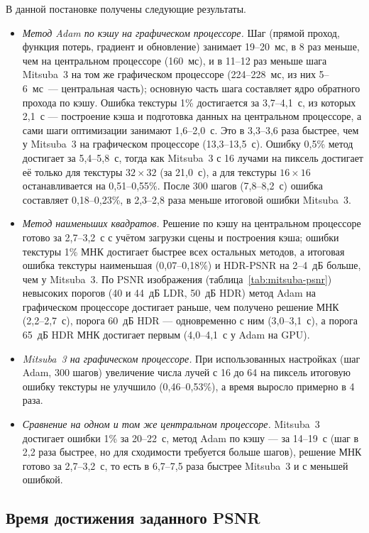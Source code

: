 В данной постановке получены следующие результаты.
\begin{itemize}
    \item \emph{Метод Adam по кэшу на графическом процессоре.} Шаг (прямой проход, функция потерь, градиент и обновление) занимает 19--20~мс, в 8 раз меньше, чем на центральном процессоре (160~мс), и в 11--12 раз меньше шага Mitsuba~3 на том же графическом процессоре (224--228~мс, из них 5--6~мс~--- центральная часть); основную часть шага составляет ядро обратного прохода по кэшу. Ошибка текстуры 1\% достигается за 3,7--4,1~с, из которых 2,1~с --- построение кэша и подготовка данных на центральном процессоре, а сами шаги оптимизации занимают 1,6--2,0~с. Это в 3,3--3,6 раза быстрее, чем у Mitsuba~3 на графическом процессоре (13,3--13,5~с). Ошибку 0,5\% метод достигает за 5,4--5,8~с, тогда как Mitsuba~3 с 16 лучами на пиксель достигает её только для текстуры $32\times32$ (за 21,0~с), а для текстуры $16\times16$ останавливается на 0,51--0,55\%. После 300 шагов (7,8--8,2~с) ошибка составляет 0,18--0,23\%, в 2,3--2,8 раза меньше итоговой ошибки Mitsuba~3.
    \item \emph{Метод наименьших квадратов.} Решение по кэшу на центральном процессоре готово за 2,7--3,2~с с учётом загрузки сцены и построения кэша; ошибки текстуры 1\% МНК достигает быстрее всех остальных методов, а итоговая ошибка текстуры наименьшая (0,07--0,18\%) и HDR-PSNR на 2--4~дБ больше, чем у Mitsuba~3. По PSNR изображения (таблица~\ref{tab:mitsuba-psnr}) невысоких порогов (40 и 44~дБ LDR, 50~дБ HDR) метод Adam на графическом процессоре достигает раньше, чем получено решение МНК (2,2--2,7~с), порога 60~дБ HDR --- одновременно с ним (3,0--3,1~с), а порога 65~дБ HDR МНК достигает первым (4,0--4,1~с у Adam на GPU).
    \item \emph{Mitsuba~3 на графическом процессоре.} При использованных настройках (шаг Adam, 300 шагов) увеличение числа лучей с 16 до 64 на пиксель итоговую ошибку текстуры не улучшило (0,46--0,53\%), а время выросло примерно в 4 раза.
    \item \emph{Сравнение на одном и том же центральном процессоре.} Mitsuba~3 достигает ошибки 1\% за 20--22~с, метод Adam по кэшу --- за 14--19~с (шаг в 2,2 раза быстрее, но для сходимости требуется больше шагов), решение МНК готово за 2,7--3,2~с, то есть в 6,7--7,5 раза быстрее Mitsuba~3 и с меньшей ошибкой.
\end{itemize}

\subsection{Время достижения заданного PSNR}


